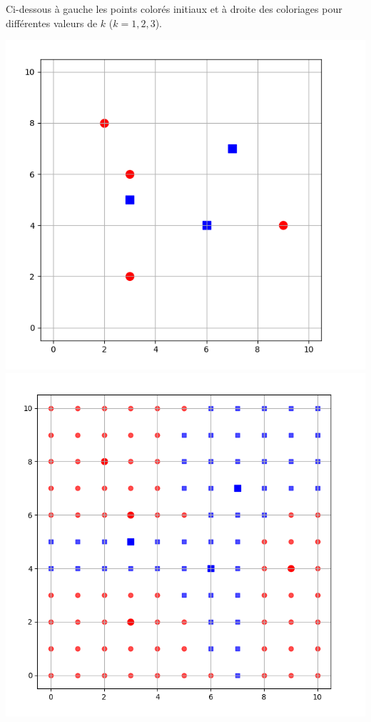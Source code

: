 \documentclass[11pt,class=report,crop=false]{standalone}
\begin{document}
\begin{activite}
\begin{enumerate}
\begin{enumerate}
	Ci-dessous à gauche les points colorés initiaux et à droite des coloriages pour différentes valeurs de $k$ ($k=1,2,3$). 
\begin{center}
	\includegraphics[scale=\myscale,scale=0.17]{ecran-voisins-8a} 
	\includegraphics[scale=\myscale,scale=0.146]{ecran-voisins-8b} 

\end{center}
\end{enumerate}
\end{enumerate}
\end{activite}
\end{document}

